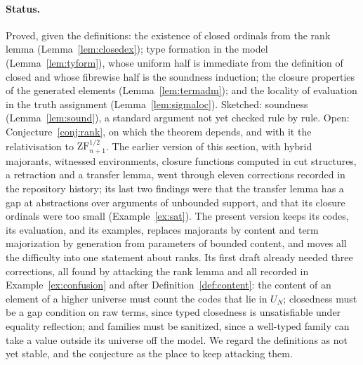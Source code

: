 \documentclass[10pt]{article}
\newcommand{\ZFh}{\mathrm{ZF}^{1/2}}
\begin{document}
\paragraph{Status.}
Proved, given the definitions: the existence of closed ordinals from the
rank lemma (Lemma~\ref{lem:closedex}); type formation in the model
(Lemma~\ref{lem:tyform}), whose uniform half is immediate from the
definition of closed and whose fibrewise half is the soundness
induction; the closure properties of the generated elements
(Lemma~\ref{lem:termadm}); and the locality of evaluation in the truth
assignment (Lemma~\ref{lem:sigmaloc}). Sketched: soundness
(Lemma~\ref{lem:sound}), a standard argument not yet checked rule by
rule. Open: Conjecture~\ref{conj:rank}, on which the theorem depends,
and with it the relativisation to $\ZFh_{n+1}$. The earlier version of
this section, with hybrid majorants, witnessed environments, closure
functions computed in cut structures, a retraction and a transfer
lemma, went through eleven corrections recorded in the repository
history; its last two findings were that the transfer lemma has a gap
at abstractions over arguments of unbounded support, and that its
closure ordinals were too small (Example~\ref{ex:sat}). The present
version keeps its codes, its evaluation, and its examples, replaces
majorants by content and term majorization by generation from
parameters of bounded content, and moves all the difficulty into one
statement about ranks. Its first draft already needed three
corrections, all found by attacking the rank lemma and all recorded in
Example~\ref{ex:confusion} and after Definition~\ref{def:content}: the
content of an element of a higher universe must count the codes that
lie in $U_N$; closedness must be a gap condition on raw terms, since
typed closedness is unsatisfiable under equality reflection; and
families must be sanitized, since a well-typed family can take a value
outside its universe off the model. We regard the definitions as not
yet stable, and the conjecture as the place to keep attacking them.

{\small

}
\end{document}
